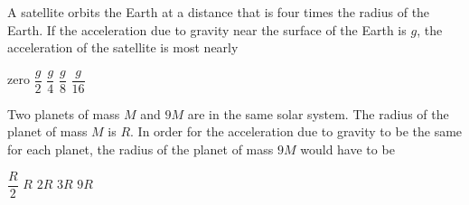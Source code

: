\documentclass{../../oss-apphys-exam}
\begin{document}
\begin{multicols*}{2}
\begin{questions}
    \question A satellite orbits the Earth at a distance that is four times the
    radius of the Earth. If the acceleration due to gravity near the surface of
    the Earth is $g$, the acceleration of the satellite is most nearly
    \begin{choices}
      \choice zero
      \choice $\dfrac g2$
      \choice $\dfrac g4$
      \choice $\dfrac g8$
      \choice $\dfrac g{16}$
    \end{choices}
  
%  
    
    \question Two planets of mass $M$ and $9M$ are in the same solar system. The
    radius of the planet of mass $M$ is $R$. In order for the acceleration due
    to gravity to be the same for each planet, the radius of the planet of mass
    $9M$ would have to be
    \begin{choices}
      \choice $\dfrac R2$
      \choice $R$
      \choice $2R$
      \choice $3R$
      \choice $9R$
    \end{choices}
    

\end{questions}
\end{multicols*}
\end{document}

